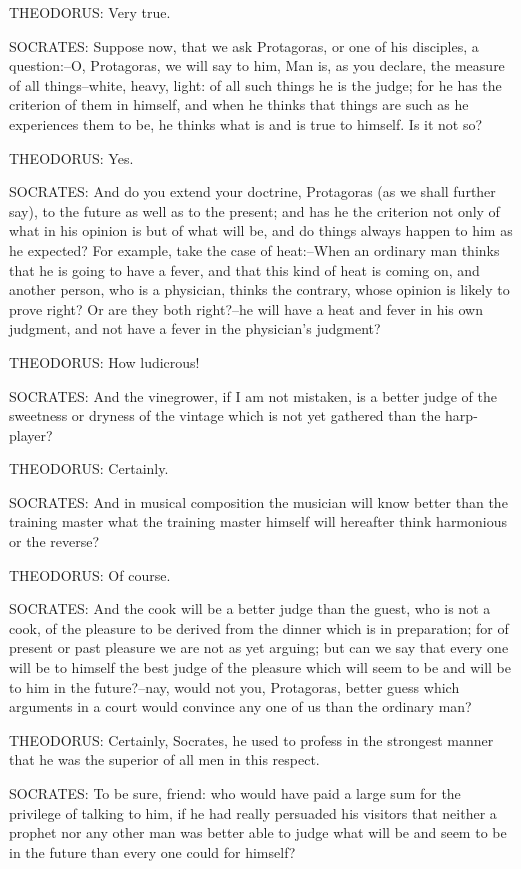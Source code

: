 THEODORUS: Very true.

SOCRATES: Suppose now, that we ask Protagoras, or one of his disciples,
a question:--O, Protagoras, we will say to him, Man is, as you declare,
the measure of all things--white, heavy, light: of all such things he
is the judge; for he has the criterion of them in himself, and when he
thinks that things are such as he experiences them to be, he thinks what
is and is true to himself. Is it not so?

THEODORUS: Yes.

SOCRATES: And do you extend your doctrine, Protagoras (as we shall
further say), to the future as well as to the present; and has he the
criterion not only of what in his opinion is but of what will be, and do
things always happen to him as he expected? For example, take the case
of heat:--When an ordinary man thinks that he is going to have a fever,
and that this kind of heat is coming on, and another person, who is a
physician, thinks the contrary, whose opinion is likely to prove right?
Or are they both right?--he will have a heat and fever in his own
judgment, and not have a fever in the physician's judgment?

THEODORUS: How ludicrous!

SOCRATES: And the vinegrower, if I am not mistaken, is a better judge of
the sweetness or dryness of the vintage which is not yet gathered than
the harp-player?

THEODORUS: Certainly.

SOCRATES: And in musical composition the musician will know better than
the training master what the training master himself will hereafter
think harmonious or the reverse?

THEODORUS: Of course.

SOCRATES: And the cook will be a better judge than the guest, who is
not a cook, of the pleasure to be derived from the dinner which is in
preparation; for of present or past pleasure we are not as yet arguing;
but can we say that every one will be to himself the best judge of the
pleasure which will seem to be and will be to him in the future?--nay,
would not you, Protagoras, better guess which arguments in a court would
convince any one of us than the ordinary man?

THEODORUS: Certainly, Socrates, he used to profess in the strongest
manner that he was the superior of all men in this respect.

SOCRATES: To be sure, friend: who would have paid a large sum for the
privilege of talking to him, if he had really persuaded his visitors
that neither a prophet nor any other man was better able to judge what
will be and seem to be in the future than every one could for himself?

